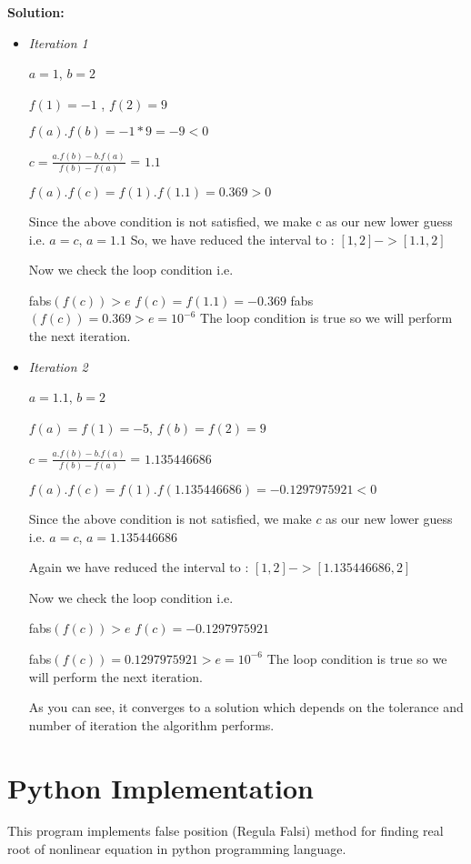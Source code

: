 \documentclass{article}
\begin{document}
\textbf{Solution:} 
\begin{itemize}
   \item \emph{Iteration 1}
   
      $a=1$, $b=2$
      
      $f(1)= -1$ , $f(2)=9$
      
      $f(a).f(b) = -1 * 9 = -9 < 0$
      
      $c = \frac{a.f(b)-b.f(a)}{f(b)-f(a)} $ = $1.1$
      
      $f(a).f(c) = f(1).f(1.1) = 0.369 > 0$
      
      Since the above condition is not satisfied, we make c as our new lower  guess i.e. 
$a = c$,
$a = 1.1$
So, we have reduced the interval to :
$[1, 2] -> [1.1, 2]$

Now we check the loop condition i.e.

 fabs$(f(c)) > e$
$f(c) = f(1.1) = -0.369$
fabs$(f(c)) = 0.369 > e = 10^{-6}$
The loop condition is true so we will perform the next iteration.


\item \emph{Iteration 2}

$a = 1.1$, $b = 2$

$f(a)=f(1)=-5$,  $f(b)=f(2)=9$

$c = \frac{a.f(b)-b.f(a)}{f(b)-f(a)} $ = $1.135446686$

$f(a).f(c) = f(1).f(1.135446686) = -0.1297975921 < 0 $   

 Since the above condition is not satisfied, we make $c$ as our new lower guess i.e.
$a = c$,
$a = 1.135446686$

Again we have reduced the interval to :
$[1,2] -> [1.135446686,2]$  

Now we check the loop condition i.e.

 fabs$(f(c)) > e$
$f(c) = -0.1297975921$

fabs$(f(c)) = 0.1297975921 > e = 10^{-6} $
The loop condition is true so we will perform the next iteration.

As you can see, it converges to a solution which depends on the tolerance and number of iteration the algorithm performs.
\end{itemize}

\pagebreak

 \section*{Python Implementation}
This program implements false position (Regula Falsi) method for finding real root of nonlinear equation in python programming language.
\end{document}
